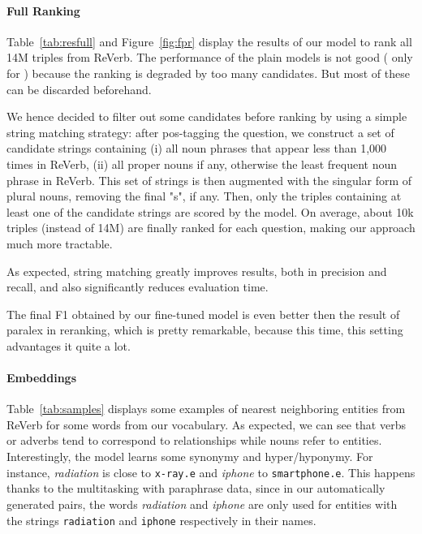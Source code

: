 \documentclass[runningheads,a4paper]{llncs}
\newcommand{\kb}[1]{{\small\texttt{#1}}\xspace}
\newcommand{\rv}{{\sc ReVerb}\xspace}
\begin{document}
\paragraph{Full Ranking}

Table~\ref{tab:resfull} and Figure~\ref{fig:fpr} display the results of our model to rank all 14M triples from \rv.
The performance of the plain models is not good ( only for ) because the ranking is degraded by too many candidates. 
But most of these can be discarded beforehand.

We hence decided to filter out some candidates before ranking by using a simple string matching strategy: 
after pos-tagging the question, we construct a set of candidate strings containing (i) all noun phrases that appear less than 1,000 times in \rv, (ii) all proper nouns if any, otherwise the least frequent noun phrase in \rv.
This set of strings is then augmented with the singular form of plural nouns, removing the final "s", if any. Then, only the triples containing at least one of the candidate strings are scored by the model. 
On average, about 10k triples (instead of 14M) are finally ranked for each question, making our approach much more tractable. 


As expected, string matching greatly improves results, both in precision and recall, and also significantly reduces evaluation time.  

The final F1 obtained by our fine-tuned model is even better then the result of {\sc paralex} in reranking, which is pretty remarkable, because this time, this setting advantages it quite a lot.


\paragraph{Embeddings}

Table~\ref{tab:samples} displays some examples of nearest neighboring entities from \rv for some words from our vocabulary.
As expected, we can see that verbs or adverbs tend to correspond to relationships while nouns refer to entities.
Interestingly, the model learns some synonymy and hyper/hyponymy. For instance,  {\it radiation} is close to \kb{x-ray.e} and {\it iphone} to \kb{smartphone.e}.
This happens thanks to the multitasking with paraphrase data, since in our automatically generated  pairs, the words {\it radiation} and {\it iphone} are only used for entities with the strings \kb{radiation} and \kb{iphone} respectively in their names.
\end{document}

